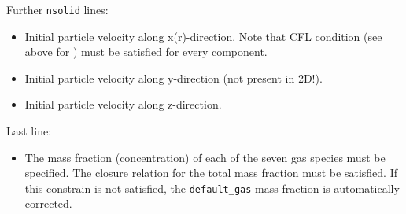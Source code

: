 Further {\tt nsolid} lines:
\begin{itemize}
\item
{}
{Initial particle velocity along x(r)-direction.
Note that CFL condition (see above for ) 
must be satisfied for every component.}

\item
{}
{Initial particle velocity along y-direction (not present in 2D!).}

\item
{}
{Initial particle velocity along z-direction.}

\end{itemize}

Last line:

\begin{itemize}

\item
{}
{The mass fraction (concentration) of each of the seven gas species must be
specified. The closure relation for the total mass fraction must be satisfied.
If this constrain is not satisfied, the {\tt default\_gas} mass fraction is
automatically corrected.}

\end{itemize}
